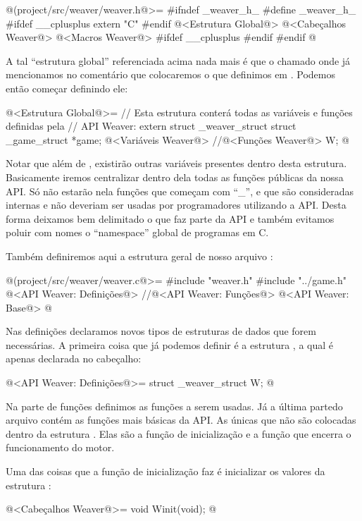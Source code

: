 \iniciocodigo
@(project/src/weaver/weaver.h@>=
#ifndef _weaver_h_
#define _weaver_h_
#ifdef __cplusplus
  extern "C" {
#endif
@<Estrutura Global@>
@<Cabeçalhos Weaver@>
@<Macros Weaver@>
#ifdef __cplusplus
  }
#endif
#endif
@
\fimcodigo

A tal ``estrutura global'' referenciada acima nada mais é que
o  chamado  onde já mencionamos no
comentário que colocaremos o 
que definimos em . Podemos então começar definindo
ele:

\iniciocodigo
@<Estrutura Global@>=
// Esta estrutura conterá todas as variáveis e funções definidas pela
// API Weaver:
extern struct _weaver_struct{
  struct _game_struct *game;
  @<Variáveis Weaver@>
  //@<Funções Weaver@>
} W;
@
\fimcodigo

Notar que além de , existirão outras variáveis
presentes dentro desta estrutura. Basicamente iremos centralizar
dentro dela todas as funções públicas da nossa API. Só não estarão
nela funções que começam com ``\_'', e que são consideradas internas e
não deveriam ser usadas por programadores utilizando a API. Desta
forma deixamos bem delimitado o que faz parte da API e também evitamos
poluir com nomes o ``namespace'' global de programas em C.

Também definiremos aqui a estrutura geral de nosso
arquivo :

\iniciocodigo
@(project/src/weaver/weaver.c@>=
#include "weaver.h"
#include "../game.h"
@<API Weaver: Definições@>
//@<API Weaver: Funções@>
@<API Weaver: Base@>
@
\fimcodigo

Nas definições declaramos novos tipos de estruturas de dados que forem
necessárias. A primeira coisa que já podemos definir é a
estrutura , a qual é apenas declarada no cabeçalho:

\iniciocodigo
@<API Weaver: Definições@>=
struct _weaver_struct W;
@
\fimcodigo

Na parte de funções definimos as funções a serem usadas. Já a última
partedo arquivo contém as funções mais básicas da API. As únicas que
não são colocadas dentro da estrutura . Elas são a
função de inicialização e a função que encerra o funcionamento do
motor.

Uma das coisas que a função de inicialização faz é inicializar os
valores da estrutura :

\iniciocodigo
@<Cabeçalhos Weaver@>=
void Winit(void);
@
\fimcodigo

